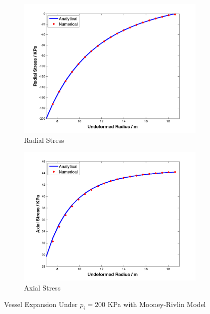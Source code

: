 \begin{figure}[H]
	\begin{subfigure}[b]{0.5\textwidth}
		\centering
		\includegraphics[width=\textwidth]{./figures/radial_stress_200.png}
		\caption{Radial Stress}
		\label{radial_200}
	\end{subfigure}
	\begin{subfigure}[b]{0.5\textwidth}
		\centering
		\includegraphics[width=\textwidth]{./figures/axial_stress_200.png}
		\caption{Axial Stress}
		\label{axial_200}
	\end{subfigure}
	\caption{Vessel Expansion Under $p_i = 200$ KPa with Mooney-Rivlin Model}
	\label{fig:mooney-rivlin1}
\end{figure}

